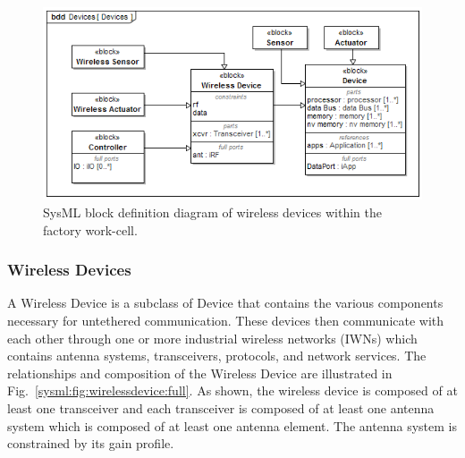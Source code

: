\begin{figure}[H]
	\centering
	\includegraphics[width=0.95\columnwidth]{./chapter-sysml/diagrams/bdd__Devices__Devices}%
	\caption{SysML block definition diagram of wireless devices within the factory work-cell.}%
	\label{sysml:fig:bdd:devices}
\end{figure}



\subsubsection{Wireless Devices}\label{sysml:sec:devices:wireless-device} 
A Wireless Device is a subclass of Device that contains the various components necessary for untethered communication.  These devices then communicate with each other through one or more industrial wireless networks (IWNs) which contains antenna systems, transceivers, protocols, and network services.  The relationships and composition of the Wireless Device are illustrated in Fig.~\ref{sysml:fig:wirelessdevice:full}. As shown, the wireless device is composed of at least one transceiver and each transceiver is composed of at least one antenna system which is composed of at least one antenna element.  The antenna system is constrained by its gain profile.



